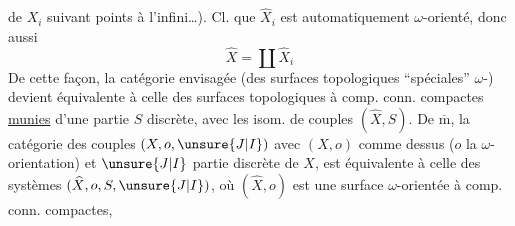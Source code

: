  de $X_i$ suivant  points à l'infini\ldots).
Cl. que $\widehat X_i$ est automatiquement $\omega$-orienté,
donc aussi
\[\widehat X=\coprod\widehat X_i\]
De cette façon, la catégorie envisagée
(des surfaces topologiques ``spéciales''
$\omega$-) devient équivalente à
celle des surfaces topologiques 
à comp. conn. compactes \uline{munies}
d'une partie  $S$ discrète,
avec les isom. de couples $(\widehat X,S)$.
De $\overline{\mathrm m}$, la catégorie des couples
 $(X,o,\unsure{J|I})$ avec $(X,o)$ comme
dessus ($o$ la $\omega$-orientation) et
$\unsure{J|I}$ partie discrète de $X$, est équivalente à celle des systèmes
$(\widehat X,o,S,\unsure{J|I})$, où $(\widehat X,o)$ est une surface
$\omega$-orientée à comp. conn. compactes,
